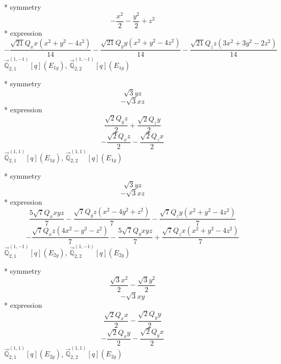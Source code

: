 \documentclass[fleqn,8pt]{jsarticle}
\begin{document}
\noindent\quad ** symmetry
\begin{dmath*}
- \frac{x^{2}}{2} - \frac{y^{2}}{2} + z^{2}
\end{dmath*}
\noindent\quad ** expression
\begin{dmath*}
- \frac{\sqrt{21} Q_{x} x \left(x^{2} + y^{2} - 4 z^{2}\right)}{14} - \frac{\sqrt{21} Q_{y} y \left(x^{2} + y^{2} - 4 z^{2}\right)}{14} - \frac{\sqrt{21} Q_{z} z \left(3 x^{2} + 3 y^{2} - 2 z^{2}\right)}{14}
\end{dmath*}
\noindent\quad $\vec{\mathbb{Q}}_{2,1}^{(1,-1)}[q](E_{1g})$, $\vec{\mathbb{Q}}_{2,2}^{(1,-1)}[q](E_{1g})$

\noindent\quad ** symmetry
\begin{dmath*}
\sqrt{3} y z
\end{dmath*}
\begin{dmath*}
- \sqrt{3} x z
\end{dmath*}
\noindent\quad ** expression
\begin{dmath*}
\frac{\sqrt{2} Q_{y} z}{2} + \frac{\sqrt{2} Q_{z} y}{2}
\end{dmath*}
\begin{dmath*}
- \frac{\sqrt{2} Q_{x} z}{2} - \frac{\sqrt{2} Q_{z} x}{2}
\end{dmath*}
\noindent\quad $\vec{\mathbb{Q}}_{2,1}^{(1,1)}[q](E_{1g})$, $\vec{\mathbb{Q}}_{2,2}^{(1,1)}[q](E_{1g})$

\noindent\quad ** symmetry
\begin{dmath*}
\sqrt{3} y z
\end{dmath*}
\begin{dmath*}
- \sqrt{3} x z
\end{dmath*}
\noindent\quad ** expression
\begin{dmath*}
\frac{5 \sqrt{7} Q_{x} x y z}{7} - \frac{\sqrt{7} Q_{y} z \left(x^{2} - 4 y^{2} + z^{2}\right)}{7} - \frac{\sqrt{7} Q_{z} y \left(x^{2} + y^{2} - 4 z^{2}\right)}{7}
\end{dmath*}
\begin{dmath*}
- \frac{\sqrt{7} Q_{x} z \left(4 x^{2} - y^{2} - z^{2}\right)}{7} - \frac{5 \sqrt{7} Q_{y} x y z}{7} + \frac{\sqrt{7} Q_{z} x \left(x^{2} + y^{2} - 4 z^{2}\right)}{7}
\end{dmath*}
\noindent\quad $\vec{\mathbb{Q}}_{2,1}^{(1,-1)}[q](E_{2g})$, $\vec{\mathbb{Q}}_{2,2}^{(1,-1)}[q](E_{2g})$

\noindent\quad ** symmetry
\begin{dmath*}
\frac{\sqrt{3} x^{2}}{2} - \frac{\sqrt{3} y^{2}}{2}
\end{dmath*}
\begin{dmath*}
- \sqrt{3} x y
\end{dmath*}
\noindent\quad ** expression
\begin{dmath*}
\frac{\sqrt{2} Q_{x} x}{2} - \frac{\sqrt{2} Q_{y} y}{2}
\end{dmath*}
\begin{dmath*}
- \frac{\sqrt{2} Q_{x} y}{2} - \frac{\sqrt{2} Q_{y} x}{2}
\end{dmath*}
\noindent\quad $\vec{\mathbb{Q}}_{2,1}^{(1,1)}[q](E_{2g})$, $\vec{\mathbb{Q}}_{2,2}^{(1,1)}[q](E_{2g})$
\end{document}
